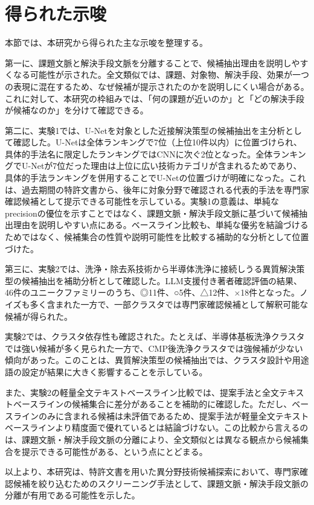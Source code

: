 \section{得られた示唆}

本節では、本研究から得られた主な示唆を整理する。

第一に、課題文脈と解決手段文脈を分離することで、候補抽出理由を説明しやすくなる可能性が示された。全文類似では、課題、対象物、解決手段、効果が一つの表現に混在するため、なぜ候補が提示されたのかを説明しにくい場合がある。これに対して、本研究の枠組みでは、「何の課題が近いのか」と「どの解決手段が候補なのか」を分けて確認できる。

第二に、実験1では、U-Netを対象とした近接解決策型の候補抽出を主分析として確認した。U-Netは全体ランキングで7位（上位10件以内）に位置づけられ、具体的手法名に限定したランキングではCNNに次ぐ2位となった。全体ランキングでU-Netが7位だった理由は上位に広い技術カテゴリが含まれるためであり、具体的手法ランキングを併用することでU-Netの位置づけが明確になった。これは、過去期間の特許文書から、後年に対象分野で確認される代表的手法を専門家確認候補として提示できる可能性を示している。実験1の意義は、単純なprecisionの優位を示すことではなく、課題文脈・解決手段文脈に基づいて候補抽出理由を説明しやすい点にある。ベースライン比較も、単純な優劣を結論づけるためではなく、候補集合の性質や説明可能性を比較する補助的な分析として位置づけた。

第三に、実験2では、洗浄・除去系技術から半導体洗浄に接続しうる異質解決策型の候補抽出を補助分析として確認した。LLM支援付き著者確認評価の結果、46件のユニークファミリーのうち、◎11件、○5件、△12件、×18件となった。ノイズも多く含まれた一方で、一部クラスタでは専門家確認候補として解釈可能な候補が得られた。

実験2では、クラスタ依存性も確認された。たとえば、半導体基板洗浄クラスタでは強い候補が多く見られた一方で、CMP後洗浄クラスタでは強候補が少ない傾向があった。このことは、異質解決策型の候補抽出では、クラスタ設計や用途語の設定が結果に大きく影響することを示している。

また、実験2の軽量全文テキストベースライン比較では、提案手法と全文テキストベースラインの候補集合に差分があることを補助的に確認した。ただし、ベースラインのみに含まれる候補は未評価であるため、提案手法が軽量全文テキストベースラインより精度面で優れているとは結論づけない。この比較から言えるのは、課題文脈・解決手段文脈の分離により、全文類似とは異なる観点から候補集合を提示できる可能性がある、という点にとどまる。

以上より、本研究は、特許文書を用いた異分野技術候補探索において、専門家確認候補を絞り込むためのスクリーニング手法として、課題文脈・解決手段文脈の分離が有用である可能性を示した。

